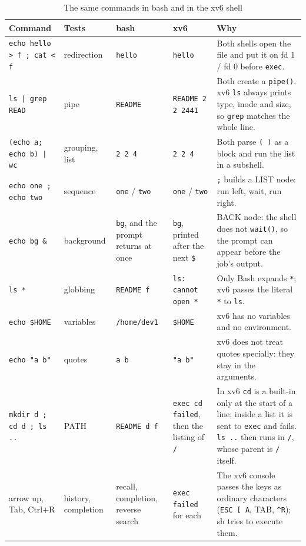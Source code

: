 \documentclass{assets/utmreport}
\begin{document}
\begin{table}[H]
\centering\small\setlength{\tabcolsep}{3pt}
\begin{tabular}{>{\raggedright\arraybackslash}p{3.0cm}>{\raggedright\arraybackslash}p{1.9cm}>{\raggedright\arraybackslash}p{2.7cm}>{\raggedright\arraybackslash}p{3.0cm}>{\raggedright\arraybackslash}p{5.2cm}}
\toprule
\textbf{Command} & \textbf{Tests} & \textbf{bash} & \textbf{xv6} & \textbf{Why} \\
\midrule
\texttt{echo hello > f ; cat < f} & redirection & \texttt{hello} & \texttt{hello} & Both shells open the file and put it on fd 1 / fd 0 before \texttt{exec}. \\
\texttt{ls | grep READ} & pipe & \texttt{README} & \texttt{README 2 2 2441} & Both create a \texttt{pipe()}. xv6 \texttt{ls} always prints type, inode and size, so \texttt{grep} matches the whole line. \\
\texttt{(echo a; echo b) | wc} & grouping, list & \texttt{2 2 4} & \texttt{2 2 4} & Both parse \texttt{( )} as a block and run the list in a subshell. \\
\texttt{echo one ; echo two} & sequence & \texttt{one} / \texttt{two} & \texttt{one} / \texttt{two} & \texttt{;} builds a LIST node: run left, wait, run right. \\
\texttt{echo bg \&} & background & \texttt{bg}, and the prompt returns at once & \texttt{bg}, printed after the next \texttt{\$} & BACK node: the shell does not \texttt{wait()}, so the prompt can appear before the job's output. \\
\texttt{ls *} & globbing & \texttt{README f} & \texttt{ls: cannot open *} & Only Bash expands \texttt{*}; xv6 passes the literal \texttt{*} to \texttt{ls}. \\
\texttt{echo \$HOME} & variables & \texttt{/home/dev1} & \texttt{\$HOME} & xv6 has no variables and no environment. \\
\texttt{echo "a b"} & quotes & \texttt{a b} & \texttt{"a b"} & xv6 does not treat quotes specially: they stay in the arguments. \\
\texttt{mkdir d ; cd d ; ls ..} & PATH & \texttt{README d f} & \texttt{exec cd failed}, then the listing of \texttt{/} & In xv6 \texttt{cd} is a built-in only at the start of a line; inside a list it is sent to \texttt{exec} and fails. \texttt{ls ..} then runs in \texttt{/}, whose parent is \texttt{/} itself. \\
arrow up, Tab, Ctrl+R & history, completion & recall, completion, reverse search & \texttt{exec failed} for each & The xv6 console passes the keys as ordinary characters (\texttt{ESC [ A}, TAB, \texttt{\^{}R}); sh tries to execute them. \\
\bottomrule
\end{tabular}
\caption{The same commands in bash and in the xv6 shell}
\end{table}
\end{document}
